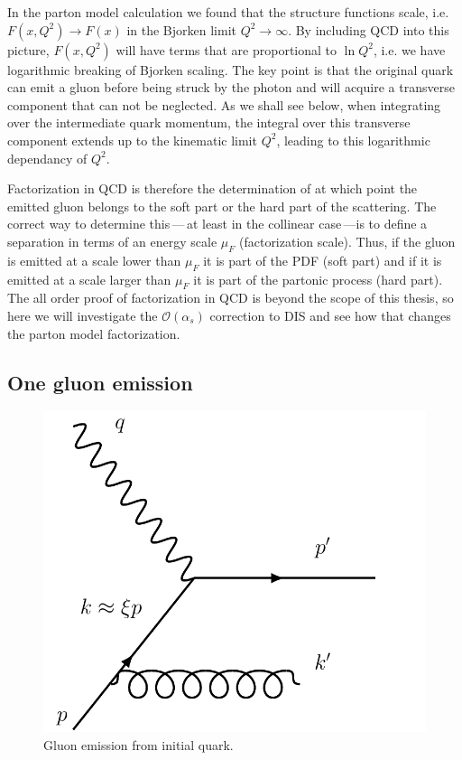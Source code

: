 \medskip
In the parton model calculation we found that the structure functions scale, i.e. $F(x,Q^{2})\rightarrow F(x)$ in the Bjorken limit $Q^{2}\rightarrow \infty$. By including QCD into this picture, $F(x,Q^{2})$ will have terms that are proportional to $\ln{Q^{2}}$, i.e. we have logarithmic breaking of Bjorken scaling. The key point is that the original quark can emit a gluon before being struck by the photon and will acquire a transverse component that can not be neglected. As we shall see below, when integrating over the intermediate quark momentum, the integral over this transverse component extends up to the kinematic limit  $Q^{2}$, leading to this logarithmic dependancy of $Q^{2}$. 

Factorization in QCD is therefore the determination of at which point the emitted gluon belongs to the soft part or the hard part of the scattering. The correct way to determine this\,---\,at least in the collinear case\,---is to define a separation in terms of an energy scale $\mu_{F}$ (factorization scale). Thus, if the gluon is emitted at a scale lower than $\mu_{F}$ it is part of the PDF (soft part) and if it is emitted at a scale larger than $\mu_F$ it is part of the partonic process (hard part). The all order proof of factorization in QCD is beyond the scope of this thesis, so here we will investigate the $\mathcal{O}(\alpha_s)$ correction to DIS and see how that changes the parton model factorization.

\medskip
\subsection*{One gluon emission}
\begin{figure}
    \centering
    \includegraphics[scale=0.4]{Figures/gluonemissionDIS.pdf}
    \caption{Gluon emission from initial quark.}
    \label{fig:DISgluonemission}
\end{figure}

